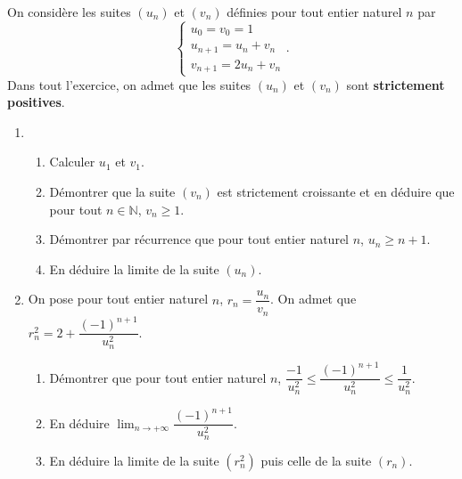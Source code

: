 \documentclass[11pt,fleqn, openany]{book} %
\begin{document}
\begin{exercise}[topic=lim11, subtitle={(Métropole 2021)}]

On considère les suites \((u_n)\) et \((v_n)\) définies pour tout entier naturel \(n\) par
\[\left\{\begin{array}{l}u_0 = v_0=1\\u_{n+1}=u_n+v_n\\v_{n+1}=2u_n+v_n\end{array}\right. .\]
Dans tout l'exercice, on admet que les suites \((u_n)\) et \((v_n)\) sont \textbf{strictement positives}.
\begin{enumerate}
 	\item
\begin{enumerate}
 	\item Calculer \(u_1\) et \(v_1\).
 	\item Démontrer que la suite \((v_n)\) est strictement croissante et en déduire que pour tout \(n\in\mathbb{N}\), \(v_n \geqslant 1\).
 	\item Démontrer par récurrence que pour tout entier naturel \(n\), \(u_n \geqslant n+1\).
 	\item En déduire la limite de la suite \((u_n)\).
\end{enumerate}

 	\item On pose pour tout entier naturel \(n\), $r_n = \dfrac{u_n}{v_n}$.
On admet que $r_n^2 = 2 + \dfrac{(-1)^{n+1}}{u_n^2}$.
\begin{enumerate}

 	\item Démontrer que pour tout entier naturel \(n\), $\dfrac{-1}{u_n^2} \leqslant \dfrac{(-1)^{n+1}}{u_n^2} \leqslant \dfrac{1}{u_n^2}$.
 	\item En déduire \(\displaystyle\lim_{n\to+\infty}\dfrac{(-1)^{n+1}}{u_n^2}\).
 	\item En déduire la limite de la suite \((r_n^2)\) puis celle de la suite \((r_n)\).
\end{enumerate}

\end{enumerate}
\newpage
\end{exercise}
\end{document}

